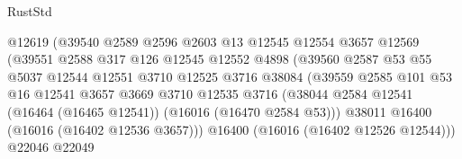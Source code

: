 \begin{lexlean}{RustStd}
\begin{coremodule}
                                      @12619
                                      (@39540
                                        @2589
                                        @2596
                                        @2603
                                        @13
                                        @12545
                                        @12554
                                        @3657
                                        @12569
                                        (@39551
                                          @2588
                                          @317
                                          @126
                                          @12545
                                          @12552
                                          @4898
                                          (@39560
                                            @2587
                                            @53
                                            @55
                                            @5037
                                            @12544
                                            @12551
                                            @3710
                                            @12525
                                            @3716
                                            @38084
                                            (@39559
                                              @2585
                                              @101
                                              @53
                                              @16
                                              @12541
                                              @3657
                                              @3669
                                              @3710
                                              @12535
                                              @3716
                                              (@38044
                                                @2584
                                                @12541
                                                (@16464 (@16465 @12541))
                                                (@16016 (@16470 @2584 @53)))
                                              @38011
                                              @16400
                                              (@16016 (@16402 @12536 @3657)))
                                            @16400
                                            (@16016 (@16402 @12526 @12544)))
                                          @22046
                                          @22049

\end{coremodule}
\end{lexlean}
